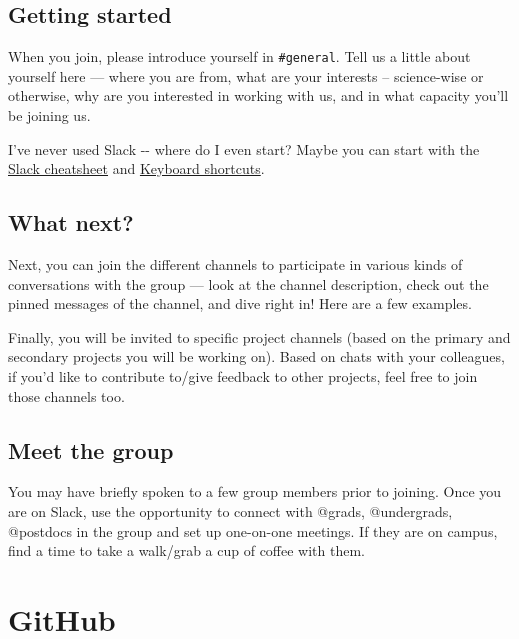 \documentclass[
  letterpaper,
  DIV=11,
  numbers=noendperiod]{scrreprt}
\begin{document}
\hypertarget{getting-started}{%
\section{Getting started}\label{getting-started}}

When you join, please introduce yourself in \texttt{\#general}. Tell us
a little about yourself here --- where you are from, what are your
interests -- science-wise or otherwise, why are you interested in
working with us, and in what capacity you'll be joining us.

I've never used Slack -\/- where do I even start? Maybe you can start
with the
\href{https://github.com/JRaviLab/cheatsheets/blob/master/slack-misc/slack-cheatsheet.pdf}{Slack
cheatsheet} and
\href{https://slack.com/help/articles/201374536-Slack-keyboard-shortcuts}{Keyboard
shortcuts}.

\hypertarget{what-next}{%
\section{What next?}\label{what-next}}

Next, you can join the different channels to participate in various
kinds of conversations with the group --- look at the channel
description, check out the pinned messages of the channel, and dive
right in! Here are a few examples.

Finally, you will be invited to specific project channels (based on the
primary and secondary projects you will be working on). Based on chats
with your colleagues, if you'd like to contribute to/give feedback to
other projects, feel free to join those channels too.

\hypertarget{meet-the-group}{%
\section{Meet the group}\label{meet-the-group}}

You may have briefly spoken to a few group members prior to joining.
Once you are on Slack, use the opportunity to connect with @grads,
@undergrads, @postdocs in the group and set up one-on-one meetings. If
they are on campus, find a time to take a walk/grab a cup of coffee with
them.


\hypertarget{github}{%
\chapter{GitHub}\label{github}}
\end{document}
